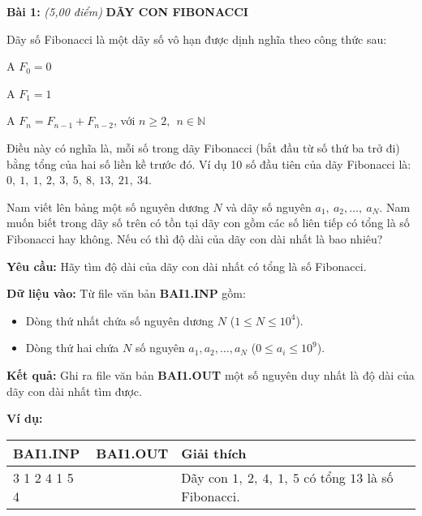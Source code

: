 \documentclass[
]{article}
\begin{document}
\textbf{Bài 1:} \emph{(5,00 điểm)} \textbf{DÃY CON FIBONACCI}

Dãy số Fibonacci là một dãy số vô hạn được dịnh nghĩa theo công thức
sau:

A \(F_{0} = 0\)

A \(F_{1} = 1\)

A \(F_{n} = F_{n - 1} + F_{n - 2}\), với
\(n \geq 2,\ \ n\mathbb{\in N}\)

Điều này có nghĩa là, mỗi số trong dãy Fibonacci (bắt đầu từ số thứ ba
trở đi) bằng tổng của hai số liền kề trước đó. Ví dụ 10 số đầu tiên của
dãy Fibonacci là: \(0,\ 1,\ 1,\ 2,\ 3,\ 5,\ 8,\ 13,\ 21,\ 34\).

Nam viết lên bảng một số nguyên dương \(N\) và dãy số nguyên
\(a_{1},\ a_{2},\ldots,\ a_{N}\). Nam muốn biết trong dãy số trên có tồn
tại dãy con gồm các số liên tiếp có tổng là số Fibonacci hay không. Nếu
có thì độ dài của dãy con dài nhất là bao nhiêu?

\textbf{Yêu cầu:} Hãy tìm độ dài của dãy con dài nhất có tổng là số
Fibonacci.

\textbf{Dữ liệu vào:} Từ file văn bản \textbf{BAI1.INP} gồm:

\begin{itemize}
\item
  Dòng thứ nhất chứa số nguyên dương \(N\) (\(1 \leq N \leq 10^{4}\)).
\item
  Dòng thứ hai chứa \(N\) số nguyên \(a_{1},a_{2},\ldots,a_{N}\)
  (\(0 \leq a_{i} \leq 10^{9}\)).
\end{itemize}

\textbf{Kết quả:} Ghi ra file văn bản \textbf{BAI1.OUT} một số nguyên
duy nhất là độ dài của dãy con dài nhất tìm được.

\textbf{Ví dụ:}

\begin{longtable}[]{@{}
  >{\raggedright\arraybackslash}p{}
  >{\raggedright\arraybackslash}p{}
  >{\raggedright\arraybackslash}p{}
  >{\raggedright\arraybackslash}p{}@{}}
\toprule\noalign{}
\begin{minipage}[b]{\linewidth}\centering
\textbf{BAI1.INP}
\end{minipage} & \begin{minipage}[b]{\linewidth}\centering
\textbf{BAI1.OUT}
\end{minipage} & \begin{minipage}[b]{\linewidth}\centering
\textbf{Giải thích}
\end{minipage} & \begin{minipage}[b]{\linewidth}\centering
\end{minipage} \\
\midrule\noalign{}
\endhead
\bottomrule\noalign{}
\endlastfoot
7

3 1 2 4 1 5 4 & 5 & Dãy con \(1,\ 2,\ 4,\ 1,\ 5\) có tổng \(13\) là số
Fibonacci. & \\
\end{longtable}
\end{document}
